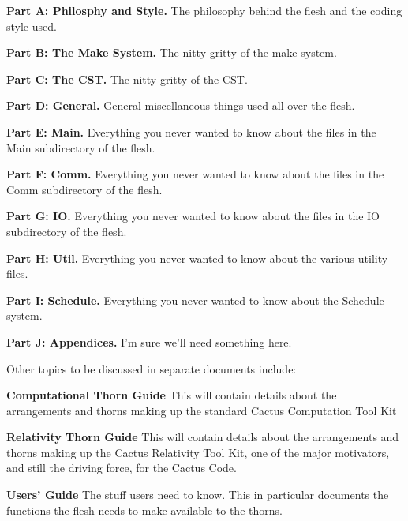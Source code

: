 \begin{Lentry}

\item [{\bf Part A: Philosphy and Style.}]
  The philosophy behind the flesh and the coding style used.

\item [{\bf Part B: The Make System.}] 
  The nitty-gritty of the make system.

\item [{\bf Part C: The CST.}] 
  The nitty-gritty of the CST.

\item [{\bf Part D: General.}]
  General miscellaneous things used all over the flesh.
 
\item [{\bf Part E: Main.}] 
  Everything you never wanted to know about the files in the Main
  subdirectory of the flesh.

\item [{\bf Part F: Comm.}] 
  Everything you never wanted to know about the files in the Comm
  subdirectory of the flesh.

\item [{\bf Part G: IO.}] 
  Everything you never wanted to know about the files in the IO
  subdirectory of the flesh.

\item [{\bf Part H: Util.}] 
  Everything you never wanted to know about the various utility
  files.

\item [{\bf Part I: Schedule.}] 
  Everything you never wanted to know about the Schedule system.

\item [\bf Part J: Appendices.] 
  I'm sure we'll need something here.

\end{Lentry}

Other topics to be discussed in separate documents include:

\begin{Lentry}

\item [{\bf Computational Thorn Guide}] This will contain details about the 
arrangements and thorns making up the standard Cactus Computation Tool Kit

\item [{\bf Relativity Thorn Guide}] This will contain details about the arrangements and thorns making up the Cactus Relativity Tool Kit, one of the major 
 motivators, and still the driving force, for the Cactus Code.

\item [{\bf Users' Guide}] 
  The stuff users need to know.  This in particular documents
  the functions the flesh needs to make available to the thorns.

\end{Lentry}

